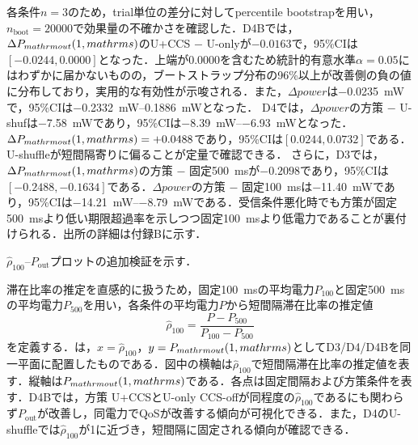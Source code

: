 各条件$n=3$のため，trial単位の差分に対してpercentile bootstrapを用い，$n_{\mathrm{boot}}=20000$で効果量の不確かさを確認した．D4Bでは，$\Delta P_{\\mathrm{out}}(1\\,\\mathrm{s})$のU+CCS $-$ U-onlyが$-0.0163$で，95\%CIは$[-0.0244, 0.0000]$となった．上端が0.0000を含むため統計的有意水準$\alpha=0.05$にはわずかに届かないものの，ブートストラップ分布の96\%以上が改善側の負の値に分布しており，実用的な有効性が示唆される．また，$\Delta power$は\SI{-0.0235}{\milli\watt}で，95\%CIは\SIrange{-0.2332}{0.1886}{\milli\watt}となった．
D4では，$\Delta power$の方策 $-$ U-shufは\SI{-7.58}{\milli\watt}であり，95\%CIは\SIrange{-8.39}{-6.93}{\milli\watt}となった．$\Delta P_{\\mathrm{out}}(1\\,\\mathrm{s})=+0.0488$であり，95\%CIは$[0.0244,0.0732]$である．U-shuffleが短間隔寄りに偏ることが定量で確認できる．
さらに，D3では，$\Delta P_{\\mathrm{out}}(1\\,\\mathrm{s})$の方策 $-$ 固定\SI{500}{\milli\second}が$-0.2098$であり，95\%CIは$[-0.2488,-0.1634]$である．$\Delta power$の方策 $-$ 固定\SI{100}{\milli\second}は\SI{-11.40}{\milli\watt}であり，95\%CIは\SIrange{-14.21}{-8.79}{\milli\watt}である．受信条件悪化時でも方策が固定\SI{500}{\milli\second}より低い期限超過率を示しつつ固定\SI{100}{\milli\second}より低電力であることが裏付けられる．出所の詳細は付録Bに示す．

$\hat{\rho}_{100}$--$P_{\mathrm{out}}$プロットの追加検証を示す．

滞在比率の推定を直感的に扱うため，固定\SI{100}{\milli\second}の平均電力$P_{100}$と固定\SI{500}{\milli\second}の平均電力$P_{500}$を用い，各条件の平均電力$P$から短間隔滞在比率の推定値
\begin{equation}
  \hat{\rho}_{100} = \frac{P-P_{500}}{P_{100}-P_{500}}
\end{equation}
を定義する．は，$x=\hat{\rho}_{100}$，$y=P_{\\mathrm{out}}(1\\,\\mathrm{s})$としてD3/D4/D4Bを同一平面に配置したものである．図中の横軸は$\hat{\rho}_{100}$で短間隔滞在比率の推定値を表す．縦軸は$P_{\\mathrm{out}}(1\\,\\mathrm{s})$である．各点は固定間隔および方策条件を表す．D4Bでは，方策 U+CCSとU-only CCS-offが同程度の$\hat{\rho}_{100}$であるにも関わらず$P_{\mathrm{out}}$が改善し，同電力でQoSが改善する傾向が可視化できる．また，D4のU-shuffleでは$\hat{\rho}_{100}$が1に近づき，短間隔に固定される傾向が確認できる．

